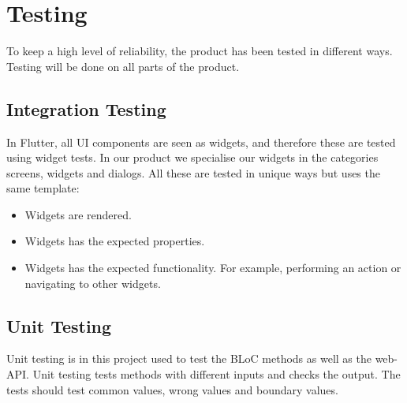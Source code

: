 \section{Testing}
\label{sect:testing}
To keep a high level of reliability, the product has been tested in different ways. Testing will be done on all parts of the product.

\subsection{Integration Testing}
In Flutter, all UI components are seen as widgets, and therefore these are tested using widget tests. In our product we specialise our widgets in the categories screens, widgets and dialogs. All these are tested in unique ways but uses the same template:
\begin{itemize}
    \item Widgets are rendered.
    \item Widgets has the expected properties.
    \item Widgets has the expected functionality.
    \subitem For example, performing an action or navigating to other widgets. 
\end{itemize}

\subsection{Unit Testing}
Unit testing is in this project used to test the BLoC methods as well as the web-API. Unit testing tests methods with different inputs and checks the output. The tests should test common values, wrong values and boundary values.  
